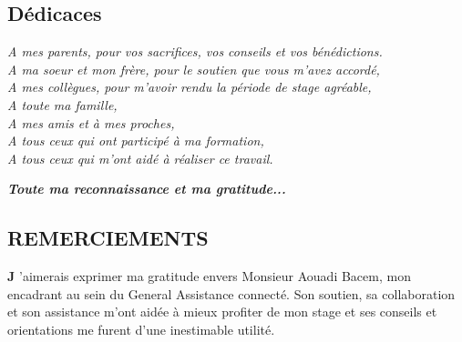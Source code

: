 \documentclass{article}
\begin{document}


\begin{center}
\section*{Dédicaces}

\end{center}

\vspace*{\fill}
\begin{center}
\emph{A mes parents, pour vos sacrifices, vos conseils et vos bénédictions.\\ \vspace{2\baselineskip}
A ma soeur et mon frère, pour le soutien que vous m'avez accordé,\\ \vspace{2\baselineskip}
A mes collègues, pour m'avoir rendu la période de stage agréable,\\ \vspace{2\baselineskip}
A toute ma famille,\\ \vspace{2\baselineskip}
A mes amis et à mes proches,\\ \vspace{2\baselineskip}
A tous ceux qui ont participé à ma formation,\\ \vspace{2\baselineskip}
A tous ceux qui m'ont aidé à réaliser ce travail.\\ \vspace{2\baselineskip}}
\end{center}
\begin{flushright}
\emph{\textbf{Toute ma reconnaissance et ma gratitude...}}
\end{flushright}
\vspace*{\fill} 
\newpage


\begin{center}
\section*{REMERCIEMENTS}\label{sec:remer}
\end{center}
\vspace*{0.3in}

\textbf{J} ’aimerais exprimer ma gratitude envers Monsieur Aouadi Bacem, mon encadrant au sein du General Assistance connecté. Son soutien, sa collaboration et son assistance m’ont aidée à mieux profiter de mon stage et ses conseils et orientations me furent d’une inestimable utilité.
\end{document}
